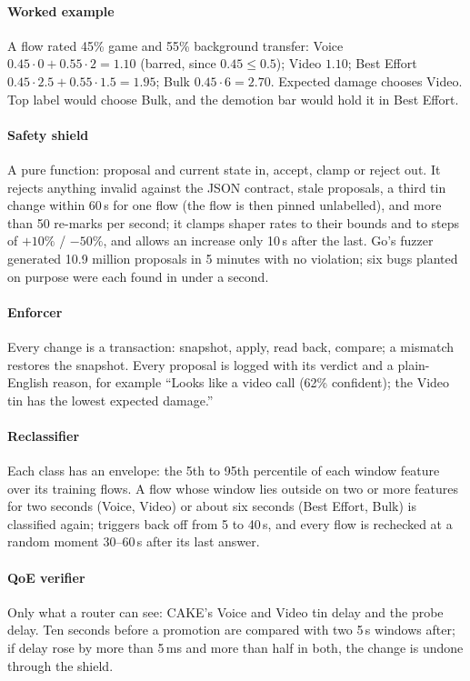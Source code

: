 \documentclass[11pt,a4paper]{article}
\begin{document}
\paragraph{Worked example} A flow rated 45\% game and 55\% background transfer: Voice $0.45\cdot0+0.55\cdot2=1.10$ (barred, since $0.45 \le 0.5$); Video $1.10$; Best Effort $0.45\cdot2.5+0.55\cdot1.5=1.95$; Bulk $0.45\cdot6=2.70$. Expected damage chooses Video. Top label would choose Bulk, and the demotion bar would hold it in Best Effort.

\paragraph{Safety shield} A pure function: proposal and current state in, accept, clamp or reject out. It rejects anything invalid against the JSON contract, stale proposals, a third tin change within 60\,s for one flow (the flow is then pinned unlabelled), and more than 50 re-marks per second; it clamps shaper rates to their bounds and to steps of $+10\%$ / $-50\%$, and allows an increase only 10\,s after the last. Go's fuzzer generated 10.9 million proposals in 5 minutes with no violation; six bugs planted on purpose were each found in under a second.

\paragraph{Enforcer} Every change is a transaction: snapshot, apply, read back, compare; a mismatch restores the snapshot. Every proposal is logged with its verdict and a plain-English reason, for example ``Looks like a video call (62\% confident); the Video tin has the lowest expected damage.''

\paragraph{Reclassifier} Each class has an envelope: the 5th to 95th percentile of each window feature over its training flows. A flow whose window lies outside on two or more features for two seconds (Voice, Video) or about six seconds (Best Effort, Bulk) is classified again; triggers back off from 5 to 40\,s, and every flow is rechecked at a random moment 30--60\,s after its last answer.

\paragraph{QoE verifier} Only what a router can see: CAKE's Voice and Video tin delay and the probe delay. Ten seconds before a promotion are compared with two 5\,s windows after; if delay rose by more than 5\,ms and more than half in both, the change is undone through the shield.
\end{document}
